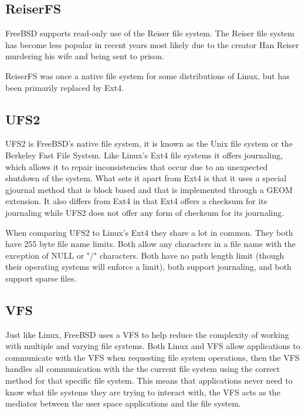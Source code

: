 \documentclass[letterpaper, 10pt, onecolumn, draftclsnofoot]{IEEEtran}
\begin{document}
\subsection{ReiserFS}

FreeBSD supports read-only use of the Reiser file system. The Reiser file system has become less popular in recent years most likely due to the creator Han Reiser murdering his wife and being sent to prison.\cite{reiserfreebsd}

ReiserFS was once a native file system for some distributions of Linux, but has been primarily replaced by Ext4.\cite{reisermurder, linuxfs}

\subsection{UFS2}

UFS2 is FreeBSD's native file system, it is known as the Unix file system or the Berkeley Fast File System. Like Linux's Ext4 file systems it offers journaling, which allows it to repair inconsistencies that occur due to an unexpected shutdown of the system. What sets it apart from Ext4 is that it uses a special gjournal method that is block based and that is implemented through a GEOM extension. It also differs from Ext4 in that Ext4 offers a checksum for its journaling while UFS2 does not offer any form of checksum for its journaling.\cite{checksum, BSD, linux}

When comparing UFS2 to Linux's Ext4 they share a lot in common. They both have 255 byte file name limits. Both allow any characters in a file name with the exception of  NULL or "/" characters. Both have no path length limit (though their operating systems will enforce a limit), both support journaling, and both support sparse files.\cite{BSD, salter,linux}

\subsection{VFS}

Just like Linux, FreeBSD uses a VFS to help reduce the complexity of working with multiple and varying file systems. Both Linux and VFS allow applications to communicate with the VFS when requesting file system operations, then the VFS handles all communication with the the current file system using the correct method for that specific file system. This means that applications never need to know what file systems they are trying to interact with, the VFS acts as the mediator between the user space applications and the file system.\cite{linux, BSD}
\end{document}
